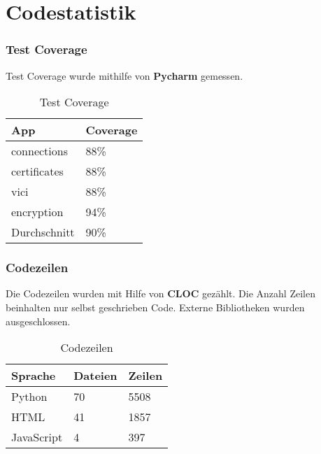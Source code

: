 \section{Codestatistik}
\subsubsection{Test Coverage}
Test Coverage wurde mithilfe von \textbf{Pycharm} gemessen. \\

\begin{table}[H]
\centering
    \begin{tabular}{|p{6cm}|p{6cm}|}
    \hline    
    \rowcolor{lightblue}
	App & Coverage \\ \hline
	connections & 88\% \\ \hline    
	certificates & 88\% \\ \hline   
	vici & 88\% \\ \hline  
	encryption & 94\% \\ \hline  
	\rowcolor{lightblue}
	Durchschnitt &   90\% \\ \hline
    \end{tabular}
    \caption[Test Coverage]{Test Coverage}
\end{table}

\subsubsection{Codezeilen}
Die Codezeilen wurden mit Hilfe von \textbf{CLOC} \cite{CLOC} gezählt. Die Anzahl Zeilen beinhalten nur selbst geschrieben Code. Externe Bibliotheken wurden ausgeschlossen. \\

\begin{table}[H]
\centering
    \begin{tabular}{|p{3cm} |p{3cm} |p{3cm} |}
    \hline    
    \rowcolor{lightblue}
	Sprache & Dateien & Zeilen  \\ \hline   
	Python & 70 & 5508 \\ \hline
	HTML & 41 & 1857 \\ \hline
	JavaScript & 4 & 397 \\ \hline
    \end{tabular}
    \caption[Codezeilen]{Codezeilen}
\end{table}

